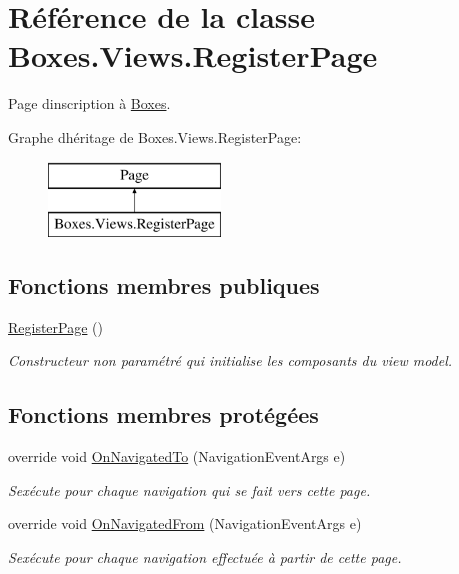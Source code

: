 \hypertarget{class_boxes_1_1_views_1_1_register_page}{}\section{Référence de la classe Boxes.\+Views.\+Register\+Page}
\label{class_boxes_1_1_views_1_1_register_page}


Page d\textquotesingle{}inscription à \hyperlink{namespace_boxes}{Boxes}.  


Graphe d\textquotesingle{}héritage de Boxes.\+Views.\+Register\+Page\+:\begin{figure}[H]
\begin{center}
\leavevmode
\includegraphics[height=2.000000cm]{class_boxes_1_1_views_1_1_register_page}
\end{center}
\end{figure}
\subsection*{Fonctions membres publiques}
\begin{DoxyCompactItemize}
\item 
\hyperlink{class_boxes_1_1_views_1_1_register_page_ad45cbf1be91ccae925a0fd311a780f21}{Register\+Page} ()
\begin{DoxyCompactList}\small\item\em Constructeur non paramétré qui initialise les composants du view model. \end{DoxyCompactList}\end{DoxyCompactItemize}
\subsection*{Fonctions membres protégées}
\begin{DoxyCompactItemize}
\item 
override void \hyperlink{class_boxes_1_1_views_1_1_register_page_a6ac37b13947f46ed324c99b6c71a89e0}{On\+Navigated\+To} (Navigation\+Event\+Args e)
\begin{DoxyCompactList}\small\item\em S\textquotesingle{}exécute pour chaque navigation qui se fait vers cette page. \end{DoxyCompactList}\item 
override void \hyperlink{class_boxes_1_1_views_1_1_register_page_ae3cfc909d2ba6a6b7dc468baf28866f0}{On\+Navigated\+From} (Navigation\+Event\+Args e)
\begin{DoxyCompactList}\small\item\em S\textquotesingle{}exécute pour chaque navigation effectuée à partir de cette page. \end{DoxyCompactList}\end{DoxyCompactItemize}
